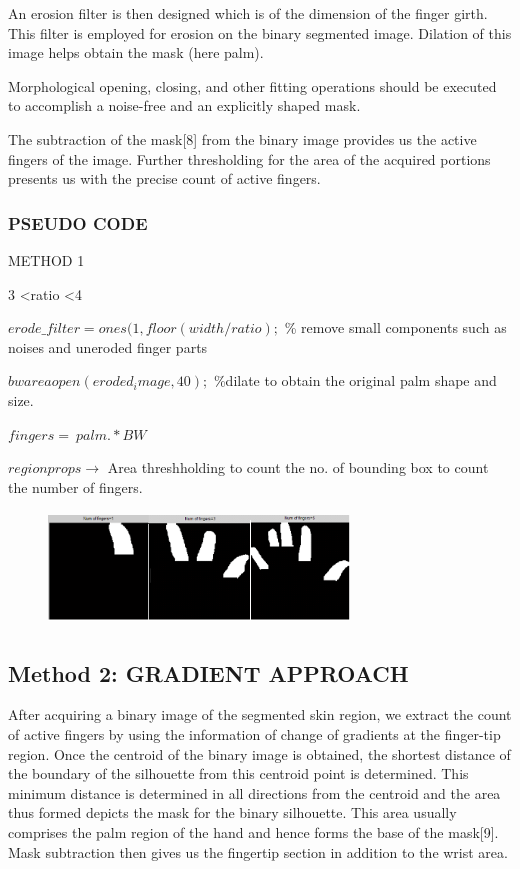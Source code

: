 \documentclass[conference]{IEEEtran}
\begin{document}
An erosion filter is then designed which is of the dimension of the finger girth. This filter is employed for erosion on the binary segmented image. Dilation of this image helps obtain the mask (here palm).

Morphological opening, closing, and other fitting operations should be executed to accomplish a noise-free and an explicitly shaped mask.

The subtraction of the mask[8] from the binary image provides us the active fingers of the image. Further thresholding for the area of the acquired portions presents us with the precise count of active fingers.


\subsubsection{PSEUDO CODE}

METHOD 1 

 3 \textless ratio \textless 4 

$erode\_filter=ones(1,floor(width/ratio); $ \% remove small components such as noises and uneroded finger parts
 
$bwareaopen(eroded_image,40);$ \%dilate to obtain the original palm shape and size. 

$fingers=~palm.*BW$ 

$regionprops \rightarrow$ Area threshholding to count the no. of bounding box to count the number of fingers.

\begin{figure}[h!]
	\centering
	\includegraphics[width = 8cm, height = 3cm]{method1_1}
\end{figure}

\subsection{Method 2: GRADIENT APPROACH}
After acquiring a binary image of the segmented skin region, we extract the count of active fingers by using the information of change of gradients at the finger-tip region.
Once the centroid of the binary image is obtained, the shortest distance of the boundary of the silhouette from this centroid point is determined. This minimum distance is determined in all directions from the centroid and the area thus formed depicts the mask for the binary silhouette. This area usually comprises the palm region of the hand and hence forms the base of the mask[9]. Mask subtraction then gives us the fingertip section in addition to the wrist area.
\end{document}
